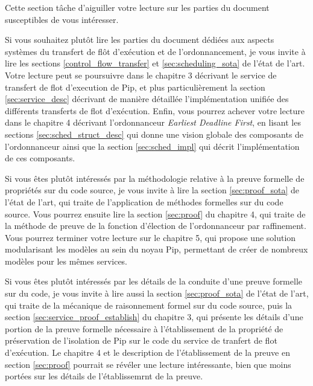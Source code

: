Cette section tâche d'aiguiller votre lecture sur les parties du document susceptibles de vous intéresser.

Si vous souhaitez plutôt lire les parties du document dédiées aux aspects systèmes du transfert de flôt d'exécution et de l'ordonnancement, je vous invite à lire les sections \ref{control_flow_transfer} et \ref{sec:scheduling_sota} de l'état de l'art. Votre lecture peut se poursuivre dans le chapitre 3 décrivant le service de transfert de flot d'execution de Pip, et plus particulièrement la section \ref{sec:service_desc} décrivant de manière détaillée l'implémentation unifiée des différents transferts de flot d'exécution. Enfin, vous pourrez achever votre lecture dans le chapitre 4 décrivant l'ordonnanceur \emph{Earliest Deadline First}, en lisant les sections \ref{sec:sched_struct_desc} qui donne une vision globale des composants de l'ordonnanceur ainsi que la section \ref{sec:sched_impl} qui décrit l'implémentation de ces composants.

Si vous êtes plutôt intéressés par la méthodologie relative à la preuve formelle de propriétés sur du code source, je vous invite à lire la section \ref{sec:proof_sota} de l'état de l'art, qui traite de l'application de méthodes formelles sur du code source. Vous pourrez ensuite lire la section \ref{sec:proof} du chapitre 4, qui traite de la méthode de preuve de la fonction d'élection de l'ordonnanceur par raffinement. Vous pourrez terminer votre lecture sur le chapitre 5, qui propose une solution modularisant les modèles au sein du noyau Pip, permettant de créer de nombreux modèles pour les mêmes services.

Si vous êtes plutôt intéressés par les détails de la conduite d'une preuve formelle sur du code, je vous invite à lire aussi la section \ref{sec:proof_sota} de l'état de l'art, qui traite de la mécanique de raisonnement formel sur du code source, puis la section \ref{sec:service_proof_establish} du chapitre 3, qui présente les détails d'une portion de la preuve formelle nécessaire à l'établissement de la propriété de préservation de l'isolation de Pip sur le code du service de tranfert de flot d'exécution. Le chapitre 4 et le description de l'établissement de la preuve en section \ref{sec:proof} pourrait se révéler une lecture intéressante, bien que moins portées sur les détails de l'établissemrnt de la preuve.

